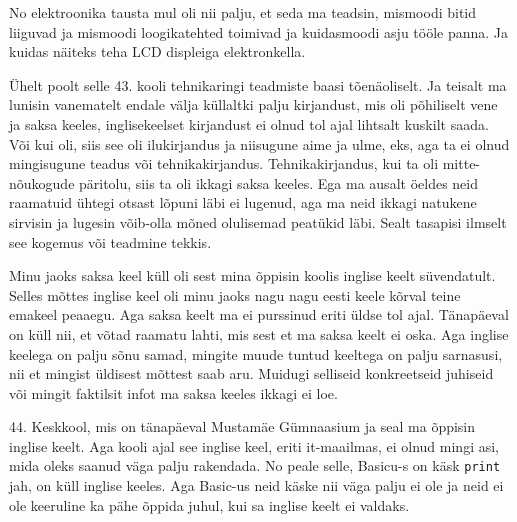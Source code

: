 No elektroonika tausta mul oli nii palju, et seda ma teadsin, mismoodi bitid liiguvad ja mismoodi  loogikatehted toimivad ja kuidasmoodi asju tööle panna. Ja kuidas näiteks teha LCD displeiga elektronkella.  


Ühelt poolt selle 43. kooli tehnikaringi teadmiste baasi tõenäoliselt. Ja teisalt ma lunisin vanematelt endale välja küllaltki palju kirjandust, mis oli põhiliselt vene ja saksa keeles, inglisekeelset kirjandust ei olnud tol ajal lihtsalt kuskilt saada. Või kui oli, siis see oli ilukirjandus ja niisugune aime ja ulme, eks, aga ta ei olnud mingisugune teadus või tehnikakirjandus. Tehnikakirjandus, kui ta oli mitte-nõukogude päritolu, siis ta oli ikkagi saksa keeles. Ega ma ausalt öeldes neid raamatuid ühtegi otsast lõpuni läbi ei lugenud, aga ma neid ikkagi natukene sirvisin ja  lugesin võib-olla mõned olulisemad peatükid läbi. Sealt tasapisi ilmselt see kogemus või  teadmine tekkis.


Minu jaoks saksa keel küll oli sest mina õppisin koolis inglise keelt süvendatult. Selles mõttes inglise keel oli  minu jaoks nagu nagu eesti keele kõrval teine emakeel peaaegu. Aga saksa keelt ma ei purssinud eriti üldse tol ajal. Tänapäeval on küll nii, et võtad raamatu lahti, mis sest et ma saksa keelt ei oska. Aga  inglise keelega on palju sõnu samad, mingite muude tuntud keeltega on palju sarnasusi, nii et mingist üldisest mõttest saab aru. Muidugi selliseid konkreetseid juhiseid või mingit faktilsit infot ma saksa keeles ikkagi ei loe. 


44. Keskkool, mis on tänapäeval Mustamäe Gümnaasium ja seal ma õppisin inglise keelt. Aga kooli ajal see inglise keel, eriti it-maailmas, ei olnud mingi asi, mida oleks saanud väga palju rakendada. No peale selle, Basicu-s on käsk \verb|print| jah, on küll inglise keeles. Aga Basic-us neid käske nii väga palju ei ole ja neid ei ole keeruline ka pähe õppida juhul, kui sa inglise keelt ei valdaks. 


